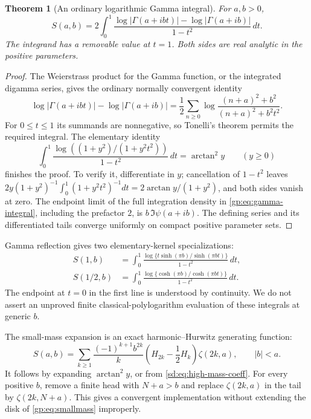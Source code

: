 \documentclass[11pt,a4paper]{article}
\numberwithin{equation}{section}
\newtheorem{theorem}{Theorem}[section]
\theoremstyle{definition}
\theoremstyle{remark}
\begin{document}
\begin{theorem}[An ordinary logarithmic Gamma integral]
\label{gp:thm:gamma-integral}
For $a,b>0$,
\begin{equation}\label{gp:eq:gamma-integral}
 \boxed{\displaystyle
 S(a,b)=2\int_0^1
  \frac{\log|\Gamma(a+ibt)|-\log|\Gamma(a+ib)|}{1-t^2}\,dt.}
\end{equation}
The integrand has a removable value at $t=1$.  Both sides are real
analytic in the positive parameters.
\end{theorem}
\begin{proof}
The Weierstrass product for the Gamma function, or the integrated
digamma series, gives the ordinary normally convergent identity
\[
 \log|\Gamma(a+ibt)|-\log|\Gamma(a+ib)|
 =\frac12\sum_{n\ge0}
          \log\frac{(n+a)^2+b^2}{(n+a)^2+b^2t^2}.
\]
For $0\le t\le1$ its summands are nonnegative, so Tonelli's theorem
permits the required integral.  The elementary identity
\begin{equation}\label{gp:eq:elementary-kernel}
 \int_0^1\frac{\log((1+y^2)/(1+y^2t^2))}{1-t^2}\,dt
 =\arctan^2y\qquad(y\ge0)
\end{equation}
finishes the proof.  To verify it, differentiate in $y$; cancellation
of $1-t^2$ leaves
$2y(1+y^2)^{-1}\int_0^1(1+y^2t^2)^{-1}dt
=2\arctan y/(1+y^2)$, and both sides vanish at zero.
The endpoint limit of the full integration density in
\eqref{gp:eq:gamma-integral}, including the prefactor $2$, is
$b\,\Im\psi(a+ib)$.  The defining series and its differentiated
tails converge uniformly on compact positive parameter sets.
\end{proof}

Gamma reflection gives two elementary-kernel specializations:
\begin{align}
 S(1,b)&=\int_0^1
       \frac{\log\{t\sinh(\pi b)/\sinh(\pi bt)\}}{1-t^2}\,dt,
       \label{gp:eq:integer}\\
 S(1/2,b)&=\int_0^1
       \frac{\log\{\cosh(\pi b)/\cosh(\pi bt)\}}{1-t^2}\,dt.
       \label{gp:eq:half}
\end{align}
The endpoint at $t=0$ in the first line is understood by continuity.
We do not assert an unproved finite classical-polylogarithm evaluation
of these integrals at generic $b$.

The small-mass expansion is an exact harmonic--Hurwitz generating function:
\begin{equation}\label{gp:eq:smallmass}
 S(a,b)=\sum_{k\ge1}\frac{(-1)^{k+1}b^{2k}}{k}
                 \left(H_{2k}-\frac12H_k\right)\zeta(2k,a),
 \qquad |b|<a.
\end{equation}
It follows by expanding $\arctan^2y$, or from
\eqref{sd:eq:high-mass-coeff}.  For every positive $b$, remove a
finite head with $N+a>b$ and replace $\zeta(2k,a)$ in the tail by
$\zeta(2k,N+a)$.  This gives a convergent implementation without
extending the disk of \eqref{gp:eq:smallmass} improperly.
\end{document}
